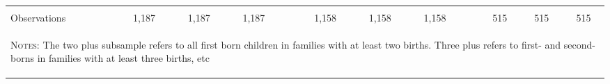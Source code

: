 \begin{landscape}
\begin{table}[htpb!]
\begin{center}
\begin{tabular}{lcccp{2mm}cccp{2mm}ccc}
\begin{footnotesize}\end{footnotesize}&\begin{footnotesize}\end{footnotesize}&\begin{footnotesize}\end{footnotesize}&\begin{footnotesize}\end{footnotesize}&\begin{footnotesize}\end{footnotesize}&\begin{footnotesize}\end{footnotesize}&\begin{footnotesize}\end{footnotesize}&\begin{footnotesize}\end{footnotesize}&\begin{footnotesize}\end{footnotesize}&\begin{footnotesize}\end{footnotesize}&\begin{footnotesize}\end{footnotesize}&\begin{footnotesize}\end{footnotesize}\\Observations&1,187&1,187&1,187&&1,158&1,158&1,158&&515&515&515\\

\midrule\multicolumn{12}{p{19.2cm}}{\begin{footnotesize}\textsc{Notes:} The two plus subsample refers to all first born children in families with at least two births.  Three plus refers to first- and second-borns in families with at least three births, etc\end{footnotesize}} \\ \bottomrule 
\end{tabular}\end{center}\end{table}\end{landscape}